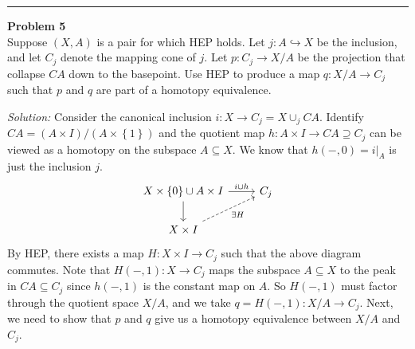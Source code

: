 \documentclass[a4paper, 12pt]{article}
\newenvironment{problem}[2][Problem]
    { \begin{mdframed}[backgroundcolor=gray!20] \textbf{#1 #2} \\}
    {  \end{mdframed}}
\newenvironment{solution}
    {\textit{Solution:}}
    {}
\begin{document}
\noindent\rule{7in}{2.8pt}
\begin{problem}{5}
Suppose \((X,A)\) is a pair for which HEP holds. Let \(j:A\hookrightarrow X\) be the inclusion, and let \(C_j\) denote the mapping cone of \(j\). Let \(p:C_j\rightarrow X/A\) be the projection that 
collapse \(CA\) down to the basepoint. Use HEP to produce a map \(q:X/A\rightarrow C_j\) such that \(p\) and \(q\) are part of a homotopy equivalence.
\end{problem}
\begin{solution}
Consider the canonical inclusion \(i:X\rightarrow C_j=X\cup_j CA\). Identify \(CA=(A\times I)/(A\times \left\{ 1 \right\})\) and the quotient map 
\(h:A\times I\rightarrow CA\supseteq C_j\) can be viewed as a homotopy on the subspace \(A\subseteq X\). We know that \(h(-,0)=i|_A\) is just the inclusion \(j\). 
\[\begin{tikzcd}
	{X\times\left\{0\right\}\cup A\times I} & {C_j} \\
	{X\times I}
	\arrow["{i\cup h}", from=1-1, to=1-2]
	\arrow[from=1-1, to=2-1]
	\arrow["{\exists H}"', dashed, from=2-1, to=1-2]
\end{tikzcd}\]
By HEP, there exists a map \(H:X\times I\rightarrow C_j\) such that the above diagram commutes. Note that \(H(-,1):X\rightarrow C_j\) maps the subspace \(A\subseteq X\) to the peak in \(CA\subseteq C_j\) since 
\(h(-,1)\) is the constant map on \(A\). So \(H(-,1)\) must factor through the quotient space \(X/A\), and we take \(q=H(-,1):X/A\rightarrow C_j\). Next, we need to show that \(p\) and \(q\) give us a homotopy equivalence 
between \(X/A\) and \(C_j\).


\end{solution}
\end{document}

